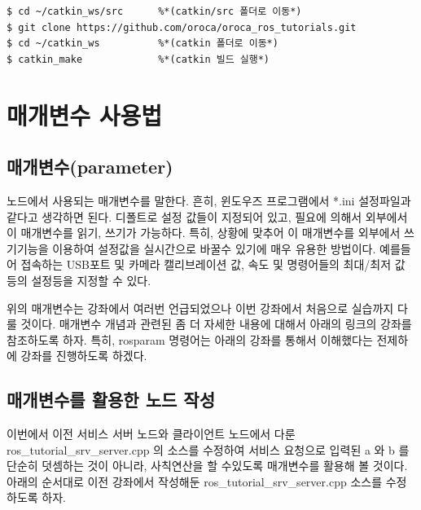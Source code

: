 \begin{lstlisting}[language=ROS]
$ cd ~/catkin_ws/src      %*(catkin/src 폴더로 이동*)
$ git clone https://github.com/oroca/oroca_ros_tutorials.git
$ cd ~/catkin_ws          %*(catkin 폴더로 이동*)
$ catkin_make             %*(catkin 빌드 실행*)
\end{lstlisting}

\newpage
\section{매개변수 사용법}

\subsection{매개변수(parameter)}

\begin{definition*}\label{def:RosParameter}
노드에서 사용되는 매개변수를 말한다. 흔히, 윈도우즈 프로그램에서 *.ini 설정파일과 같다고 생각하면 된다. 디폴트로 설정 값들이 지정되어 있고, 필요에 의해서 외부에서 이 매개변수를 읽기, 쓰기가 가능하다. 특히, 상황에 맞추어 이 매개변수를 외부에서 쓰기기능을 이용하여 설정값을 실시간으로 바꿀수 있기에 매우 유용한 방법이다. 예를들어 접속하는 USB포트 및 카메라 캘리브레이션 값, 속도 및 명령어들의 최대/최저 값 등의 설정등을 지정할 수 있다.
\end{definition*}

위의 매개변수는 강좌에서 여러번 언급되었으나 이번 강좌에서 처음으로 실습까지 다룰 것이다. 매개변수 개념과 관련된 좀 더 자세한 내용에 대해서 아래의 링크의 강좌를 참조하도록 하자. 특히, rosparam 명령어는 아래의 강좌를 통해서 이해했다는 전제하에 강좌를 진행하도록 하겠다.

\subsection{매개변수를 활용한 노드 작성}

이번에서 이전 서비스 서버 노드와 클라이언트 노드에서 다룬 ros\_tutorial\_srv\_server.cpp 의 소스를 수정하여 서비스 요청으로 입력된 a 와 b 를 단순히 덧셈하는 것이 아니라, 사칙연산을 할 수있도록 매개변수를 활용해 볼 것이다. 아래의 순서대로 이전 강좌에서 작성해둔 ros\_tutorial\_srv\_server.cpp 소스를 수정하도록 하자.

